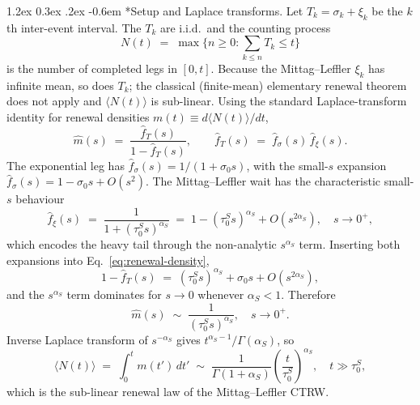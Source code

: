 \documentclass[11pt,a4paper]{article}
\makeatletter
\renewcommand\paragraph{\@startsection{paragraph}{4}{\z@}%
  {1.2ex \@plus 0.3ex \@minus .2ex}%
  {-0.6em}%
  {\normalfont\normalsize\itshape}}
\makeatother
\begin{document}
\paragraph*{Setup and Laplace transforms.}
Let $T_k = \sigma_k + \xi_k$ be the $k$th inter-event interval.
The $T_k$ are i.i.d.\ and the counting process
\[
N(t) \;=\; \max\bigl\{n\ge 0 : \textstyle\sum_{k\le n} T_k \le t\bigr\}
\]
is the number of completed legs in $[0,t]$. Because the
Mittag--Leffler $\xi_k$ has infinite mean, so does $T_k$; the
classical (finite-mean) elementary renewal theorem does not apply
and $\langle N(t)\rangle$ is sub-linear. Using the standard
Laplace-transform identity for renewal densities
$m(t)\equiv d\langle N(t)\rangle/dt$,
\begin{equation}
\hat{m}(s) \;=\; \frac{\hat{f}_T(s)}{1-\hat{f}_T(s)},
\qquad
\hat{f}_T(s) \;=\; \hat{f}_\sigma(s)\,\hat{f}_\xi(s).
\label{eq:renewal-density}
\end{equation}
The exponential leg has
$\hat{f}_\sigma(s) = 1/(1+\sigma_0 s)$, with the small-$s$
expansion $\hat{f}_\sigma(s) = 1 - \sigma_0 s + O(s^2)$. The
Mittag--Leffler wait has the characteristic small-$s$ behaviour
\begin{equation}
\hat{f}_\xi(s) \;=\; \frac{1}{1 + (\tau_0^S s)^{\alpha_S}}
\;=\; 1 - (\tau_0^S s)^{\alpha_S} + O(s^{2\alpha_S}),
\quad s\to 0^+,
\label{eq:ML-laplace}
\end{equation}
which encodes the heavy tail through the non-analytic
$s^{\alpha_S}$ term. Inserting both expansions into
Eq.~\eqref{eq:renewal-density},
\[
1 - \hat{f}_T(s)
\;=\; (\tau_0^S s)^{\alpha_S} + \sigma_0 s + O(s^{2\alpha_S}),
\]
and the $s^{\alpha_S}$ term dominates for $s\to 0$ whenever
$\alpha_S < 1$. Therefore
\begin{equation}
\hat{m}(s) \;\sim\; \frac{1}{(\tau_0^S s)^{\alpha_S}},
\quad s\to 0^+.
\label{eq:renewal-small-s}
\end{equation}
Inverse Laplace transform of $s^{-\alpha_S}$ gives
$t^{\alpha_S-1}/\Gamma(\alpha_S)$, so
\begin{equation}
\langle N(t)\rangle
\;=\; \int_0^t m(t')\,dt'
\;\sim\; \frac{1}{\Gamma(1+\alpha_S)}\left(\frac{t}{\tau_0^S}\right)^{\alpha_S},
\quad t\gg\tau_0^S,
\label{eq:mean-N}
\end{equation}
which is the sub-linear renewal law of the Mittag--Leffler CTRW.
\end{document}
